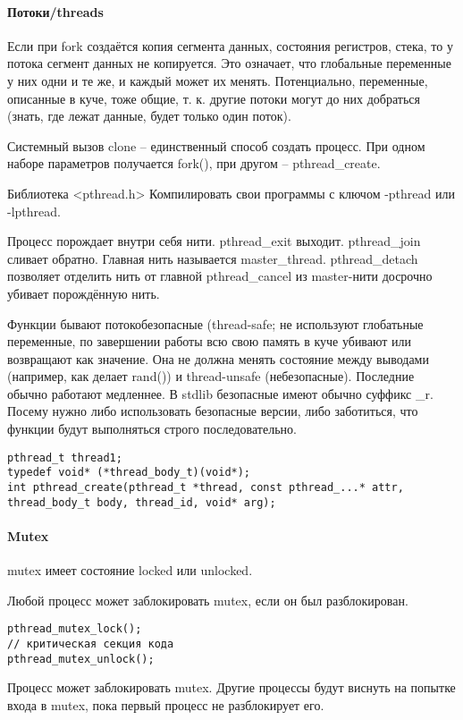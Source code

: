 \documentclass[a4paper,10pt]{article}
\begin{document}
\paragraph{Потоки/threads}
Если при fork создаётся копия сегмента данных, состояния регистров, стека, то у потока сегмент данных не копируется. Это означает, что глобальные переменные у них одни и те же, и каждый может их менять. Потенциально, переменные, описанные в куче, тоже общие, т. к. другие потоки могут до них добраться (знать, где лежат данные, будет только один поток).

Системный вызов clone -- единственный способ создать процесс. При одном наборе параметров получается fork(), при другом -- pthread\_create.

Библиотека <pthread.h>
Компилировать свои программы с ключом -pthread или -lpthread.

Процесс порождает внутри себя нити. pthread\_exit выходит. pthread\_join сливает обратно. 
Главная нить называется master\_thread. pthread\_detach позволяет отделить нить от главной 
pthread\_cancel из master-нити досрочно убивает порождённую нить.

Функции бывают потокобезопасные (thread-safe; не используют глобатьные переменные, по завершении работы всю свою память в куче убивают или возвращают как значение. Она не должна менять состояние между выводами (например, как делает rand()) и thread-unsafe (небезопасные). Последние обычно работают медленнее. В stdlib безопасные имеют обычно суффикс \_r.
Посему нужно либо использовать безопасные версии, либо заботиться, что функции будут выполняться строго последовательно.
\begin{verbatim}
pthread_t thread1;
typedef void* (*thread_body_t)(void*);
int pthread_create(pthread_t *thread, const pthread_...* attr, thread_body_t body, thread_id, void* arg);
\end{verbatim}

\paragraph{Mutex}
mutex имеет состояние locked или unlocked.

Любой процесс может заблокировать mutex, если он был разблокирован.

\begin{verbatim}
pthread_mutex_lock();
// критическая секция кода
pthread_mutex_unlock();
\end{verbatim}

Процесс может заблокировать mutex. Другие процессы будут виснуть на попытке входа в mutex, пока первый процесс не разблокирует его.
\end{document}
